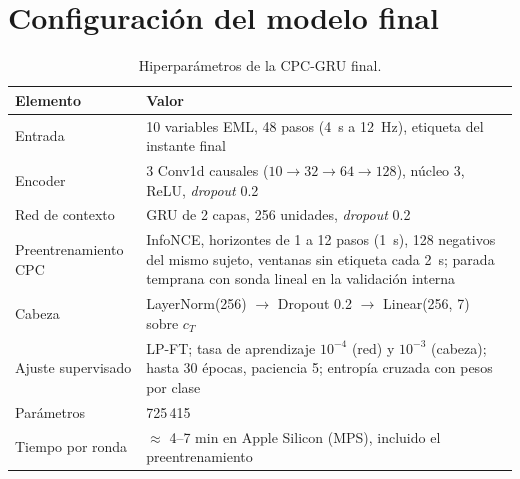 \documentclass[letterpaper,11pt]{article}
\begin{document}
\section{Configuración del modelo final}
\label{anx:config}
\begin{table}[H]
  \centering
  \small
  \caption{Hiperparámetros de la CPC-GRU final.}
  \begin{tabular}{p{4.5cm}p{9.8cm}}
    \toprule
    Elemento & Valor \\
    \midrule
    Entrada & 10 variables EML, 48 pasos (4~s a 12~Hz), etiqueta del instante final \\
    Encoder & 3 Conv1d causales ($10 \to 32 \to 64 \to 128$), núcleo 3, ReLU, \emph{dropout} 0.2 \\
    Red de contexto & GRU de 2 capas, 256 unidades, \emph{dropout} 0.2 \\
    Preentrenamiento CPC & InfoNCE, horizontes de 1 a 12 pasos (1~s), 128 negativos del mismo sujeto, ventanas sin etiqueta cada 2~s; parada temprana con sonda lineal en la validación interna \\
    Cabeza & LayerNorm(256) $\to$ Dropout 0.2 $\to$ Linear(256, 7) sobre $c_T$ \\
    Ajuste supervisado & LP-FT; tasa de aprendizaje $10^{-4}$ (red) y $10^{-3}$ (cabeza); hasta 30 épocas, paciencia 5; entropía cruzada con pesos por clase \\
    Parámetros & 725\,415 \\
    Tiempo por ronda & $\approx$ 4--7 min en Apple Silicon (MPS), incluido el preentrenamiento \\
    \bottomrule
  \end{tabular}
\end{table}
\end{document}
